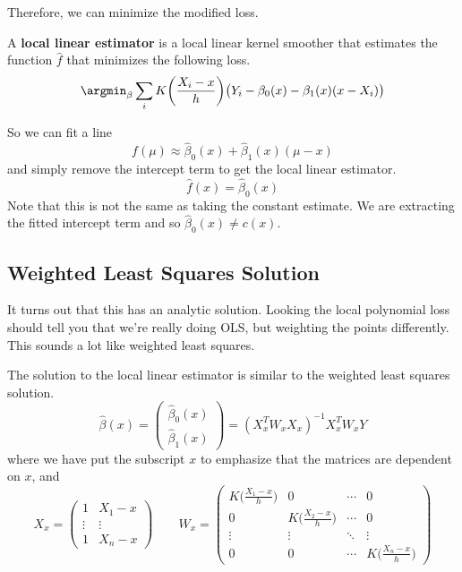   Therefore, we can minimize the modified loss. 

  \begin{definition}
    A \textbf{local linear estimator} is a local linear kernel smoother that estimates the function $\hat{f}$ that minimizes the following loss. 
    \begin{equation}
      \argmin_{\beta} \sum_i K \bigg( \frac{X_i - x}{h} \bigg) \big( Y_i - \beta_0 (x) - \beta_1 (x) (x- X_i)\big)
    \end{equation}
  \end{definition}

  So we can fit a line 
  \begin{equation}
    f(\mu) \approx \hat{\beta}_0 (x) + \hat{\beta}_1 (x) (\mu - x)
  \end{equation}
  and simply remove the intercept term to get the local linear estimator. 
  \begin{equation}
    \hat{f}(x) = \hat{\beta}_0 (x)
  \end{equation}
  Note that this is not the same as taking the constant estimate. We are extracting the fitted intercept term and so $\hat{\beta}_0(x) \neq c(x)$. 

\subsection{Weighted Least Squares Solution}

  It turns out that this has an analytic solution. Looking the local polynomial loss should tell you that we're really doing OLS, but weighting the points differently. This sounds a lot like weighted least squares. 

  \begin{theorem}
    The solution to the local linear estimator is similar to the weighted least squares solution. 
    \begin{equation}
      \hat{\beta}(x) = \begin{pmatrix} \hat{\beta}_0 (x) \\ \hat{\beta}_1 (x) \end{pmatrix} = (X_x^T W_x X_x)^{-1} X_x^T W_x Y
    \end{equation}
    where we have put the subscript $x$ to emphasize that the matrices are dependent on $x$, and 
    \begin{equation}
      X_x = \begin{pmatrix} 1 & X_1 - x \\ \vdots & \vdots \\ 1 & X_n - x \end{pmatrix} \qquad W_x = \begin{pmatrix} K \big( \frac{X_1 - x}{h} \big) & 0 & \cdots & 0 \\ 0 & K \big( \frac{X_2 - x}{h} \big) & \cdots & 0 \\ \vdots & \vdots & \ddots & \vdots \\ 0 & 0 & \cdots & K \big( \frac{X_n - x}{h} \big) \end{pmatrix}
    \end{equation}
  \end{theorem}

